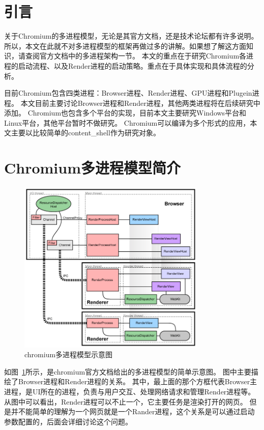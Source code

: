 
\section{引言}
关于Chromium的多进程模型，无论是其官方文档，还是技术论坛都有许多说明。
所以，本文在此就不对多进程模型的框架再做过多的讲解。如果想了解这方面知识，请查阅官方文档中的多进程架构一节。
本文的重点在于研究Chromium各进程的启动流程、以及Render进程的启动策略。重点在于具体实现和具体流程的分析。

目前Chromium包含四类进程：Browser进程、Render进程、GPU进程和Plugein进程。
本文目前主要讨论Browser进程和Render进程，其他两类进程将在后续研究中添加。
Chromium也包含多个平台的实现，目前本文主要研究Windows平台和Linux平台，其他平台暂时不做研究。
Chromium可以编译为多个形式的应用，本文主要以比较简单的content\_shell作为研究对象。

\section{Chromium多进程模型简介}

\begin{figure}[H] 
  \centering 
  \includegraphics[width=0.80\textwidth]{image/process_study/multi_process_architecture.png} 
  \caption{chromium多进程模型示意图} \label{fig:multi_process_architecture} 
\end{figure}

如图~\ref{fig:multi_process_architecture}所示，是chromium官方文档给出的多进程模型的简单示意图。
图中主要描绘了Browser进程和Render进程的关系。
其中，最上面的那个方框代表Browser主进程，是UI所在的进程，负责与用户交互、处理网络请求和管理Render进程等。
从图中可以看出，Render进程可以不止一个，它主要任务是渲染打开的网页。
但是并不能简单的理解为一个网页就是一个Rander进程，这个关系是可以通过启动参数配置的，后面会详细讨论这个问题。

